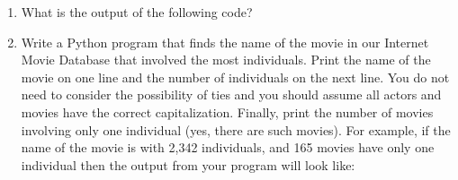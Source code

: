 \documentclass[letterpaper,10pt,english]{sphinxmanual}
\begin{document}
\begin{enumerate}
\item {} 
What is the output of the following code?

%
\begin{sphinxVerbatim}[commandchars=\\\{\}]
  
  \PYG{p}{[}    \PYG{p}{]}
\PYG{p}{[}\PYG{p}{]}  
\PYG{p}{[}\PYG{p}{]}  
 \PYG{p}{[}\PYG{p}{]} 
\PYG{p}{[}\PYG{p}{]}  \PYG{p}{[}\PYG{p}{]}
\PYG{p}{[}\PYG{p}{]}
\PYG{p}{[}\PYG{p}{]}
 
   
      \PYG{p}{[}\PYG{p}{]} 
\end{sphinxVerbatim}

\item {} 
Write a Python program that finds the name of the movie in our
Internet Movie Database that involved the most  individuals. Print
the name of the movie on one line and the number of individuals on
the next line.  You do not need to consider the possibility of
ties and you should assume all actors and movies have the correct
capitalization.  Finally, print the number of movies involving only one
individual (yes, there are such movies).  For example, if the name
of the movie is  with 2,342 individuals, and 165 movies
have only one individual then the output from your program will
look like:


\end{enumerate}
\end{document}
